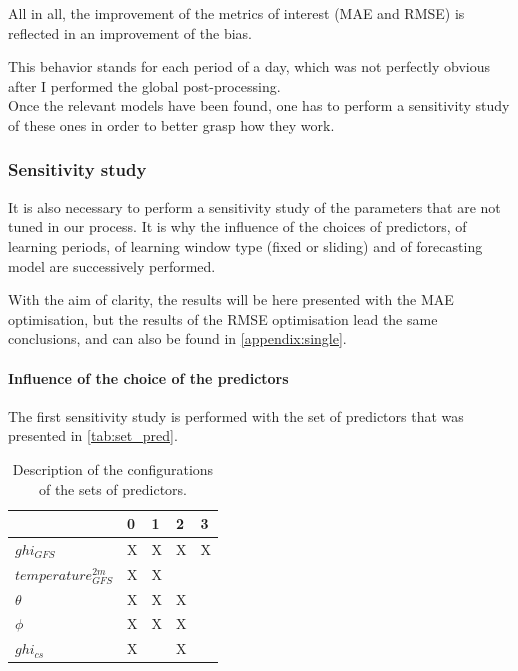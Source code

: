 All in all, the improvement of the metrics of interest (MAE and RMSE) is reflected in an improvement of the bias. 

This behavior stands for each period of a day, which was not perfectly obvious after I performed the global post-processing.\\

Once the relevant models have been found, one has to perform a sensitivity study of these ones in order to better grasp how they work.

\subsubsection{Sensitivity study}
It is also necessary to perform a sensitivity study of the parameters that are not tuned in our process. It is why the influence of the choices of predictors, of learning periods, of learning window type (fixed or sliding) and of forecasting model are successively performed. 

With the aim of clarity, the results will be here presented with the MAE optimisation, but the results of the RMSE optimisation lead the same conclusions, and can also
be found in \autoref{appendix:single}.

\paragraph{Influence of the choice of the predictors}
The first sensitivity study is performed with the set of predictors that was presented in \autoref{tab:set_pred}.
\begin{table}[htb!]
\begin{center}
\begin{tabular}{|l|llll|}
\toprule
{} &  0 &  1 &  2 &  3 \\
\midrule
$ghi_{GFS}$            &  X &  X &  X &  X \\
$temperature^{2m}_{GFS}$ &  X &  X &    &    \\
$\theta$             &  X &  X &  X &    \\
$\phi$            &  X &  X &  X &    \\
$ghi_{cs}$             &  X &    &  X &    \\
\bottomrule
\end{tabular}
\end{center}
\label{tab:pred_configs}
\caption{Description of the configurations of the sets of predictors.}
\end{table}


